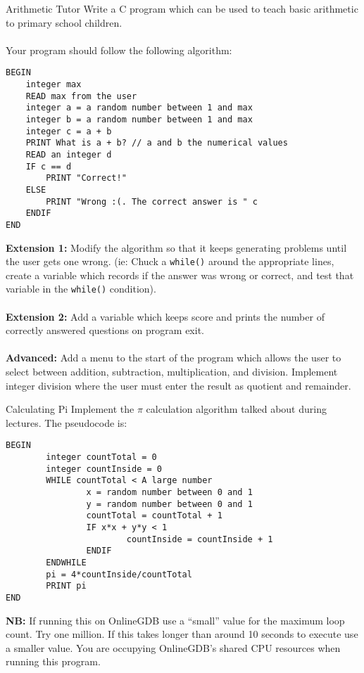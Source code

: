\documentclass{lab}
\begin{document}
\begin{task}{Arithmetic Tutor}{}
Write a C program which can be used to teach basic arithmetic to primary school children.
\\ \\
Your program should follow the following algorithm:
\begin{lstlisting}[style=pseudo]
BEGIN
	integer max
	READ max from the user
	integer a = a random number between 1 and max
	integer b = a random number between 1 and max
	integer c = a + b
	PRINT What is a + b? // a and b the numerical values
	READ an integer d
	IF c == d
		PRINT "Correct!"
	ELSE
		PRINT "Wrong :(. The correct answer is " c
	ENDIF
END
\end{lstlisting}
\textbf{Extension 1:} Modify the algorithm so that it keeps generating problems until the user gets one wrong. (ie: Chuck a \texttt{while()} around the appropriate lines, create a variable which records if the answer was wrong or correct, and test that variable in the \texttt{while()} condition).
\\ \\
\textbf{Extension 2:} Add a variable which keeps score and prints the number of correctly answered questions on program exit.
\\ \\
\textbf{Advanced:} Add a menu to the start of the program which allows the user to select between addition, subtraction, multiplication, and division. Implement integer division where the user must enter the result as quotient and remainder.
\end{task}

\begin{task}{Calculating Pi}{}
Implement the $\pi$ calculation algorithm talked about during lectures. The pseudocode is:
\begin{lstlisting}[style=pseudo]
BEGIN
        integer countTotal = 0
        integer countInside = 0
        WHILE countTotal < A large number
                x = random number between 0 and 1
                y = random number between 0 and 1
                countTotal = countTotal + 1
                IF x*x + y*y < 1
                        countInside = countInside + 1
                ENDIF
        ENDWHILE
        pi = 4*countInside/countTotal
        PRINT pi
END
\end{lstlisting}
\textbf{NB:} If running this on OnlineGDB use a ``small'' value for the maximum loop count. Try one million. If this takes longer than around 10 seconds to execute use a smaller value. You are occupying OnlineGDB's shared CPU resources when running this program.
\end{task}
\end{document}

